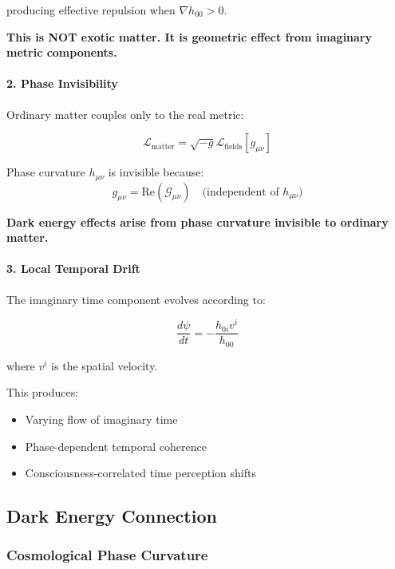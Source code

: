 producing effective repulsion when $\nabla h_{00} > 0$.

\textbf{This is NOT exotic matter. It is geometric effect from imaginary metric components.}

\paragraph{2. Phase Invisibility}

Ordinary matter couples only to the real metric:

\begin{equation}
\mathcal{L}_{\text{matter}} = \sqrt{-g} \mathcal{L}_{\text{fields}}[g_{\mu\nu}]
\end{equation}

Phase curvature $h_{\mu\nu}$ is invisible because:
\begin{equation}
g_{\mu\nu} = \text{Re}(\mathcal{G}_{\mu\nu}) \quad \text{(independent of } h_{\mu\nu}\text{)}
\end{equation}

\textbf{Dark energy effects arise from phase curvature invisible to ordinary matter.}

\paragraph{3. Local Temporal Drift}

The imaginary time component evolves according to:

\begin{equation}
\frac{d\psi}{dt} = -\frac{h_{0i} v^i}{h_{00}}
\end{equation}

where $v^i$ is the spatial velocity.

This produces:
\begin{itemize}
    \item Varying flow of imaginary time
    \item Phase-dependent temporal coherence
    \item Consciousness-correlated time perception shifts
\end{itemize}

\subsection{Dark Energy Connection}

\subsubsection{Cosmological Phase Curvature}

